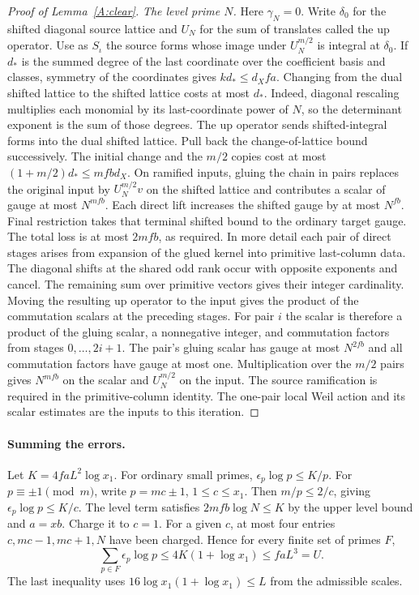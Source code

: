 \begin{proof}[Proof of Lemma~\ref{A:clear}]
\emph{The level prime $N$.} Here $\gamma_N=0$. Write $\delta_0$ for the shifted diagonal source lattice and $U_N$ for the sum of translates called the up operator. Use as $S_\iota$ the source forms whose image under $U_N^{m/2}$ is integral at $\delta_0$. If $d_*$ is the summed degree of the last coordinate over the coefficient basis and classes, symmetry of the coordinates gives $k d_*\le d_X fa$. Changing from the dual shifted lattice to the shifted lattice costs at most $d_*$. Indeed, diagonal rescaling multiplies each monomial by its last-coordinate power of $N$, so the determinant exponent is the sum of those degrees. The up operator sends shifted-integral forms into the dual shifted lattice. Pull back the change-of-lattice bound successively. The initial change and the $m/2$ copies cost at most $(1+m/2)d_*\le mfb d_X$. On ramified inputs, gluing the chain in pairs replaces the original input by $U_N^{m/2}v$ on the shifted lattice and contributes a scalar of gauge at most $N^{mfb}$. Each direct lift increases the shifted gauge by at most $N^{fb}$. Final restriction takes that terminal shifted bound to the ordinary target gauge. The total loss is at most $2mfb$, as required.
In more detail each pair of direct stages arises from expansion of the glued kernel into primitive last-column data. The diagonal shifts at the shared odd rank occur with opposite exponents and cancel. The remaining sum over primitive vectors gives their integer cardinality. Moving the resulting up operator to the input gives the product of the commutation scalars at the preceding stages. For pair $i$ the scalar is therefore a product of the gluing scalar, a nonnegative integer, and commutation factors from stages $0,\ldots,2i+1$. The pair's gluing scalar has gauge at most $N^{2fb}$ and all commutation factors have gauge at most one. Multiplication over the $m/2$ pairs gives $N^{mfb}$ on the scalar and $U_N^{m/2}$ on the input. The source ramification is required in the primitive-column identity. The one-pair local Weil action and its scalar estimates are the inputs to this iteration.

\end{proof}

\paragraph{Summing the errors.}\label{A:loss}
Let $K=4faL^2\log x_1$. For ordinary small primes, $\epsilon_p\log p\le K/p$. For $p\equiv\pm1\pmod m$, write $p=mc\pm1$, $1\le c\le x_1$. Then $m/p\le2/c$, giving $\epsilon_p\log p\le K/c$. The level term satisfies $2mfb\log N\le K$ by the upper level bound and $a=xb$. Charge it to $c=1$. For a given $c$, at most four entries $c,mc-1,mc+1,N$ have been charged. Hence for every finite set of primes $F$,
\begin{equation}
 \sum_{p\in F} \epsilon_p\log p\le4K(1+\log x_1)\le faL^3=U .\label{A:budget}
\end{equation}
The last inequality uses $16\log x_1(1+\log x_1)\le L$ from the admissible scales.

